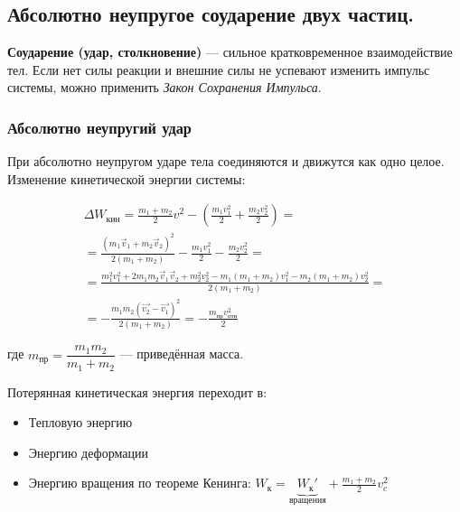 \subsection{Абсолютно неупругое соударение двух частиц.}
\textbf{Соударение (удар, столкновение)} — сильное кратковременное взаимодействие тел. Если нет силы реакции и внешние силы не успевают изменить импульс системы, можно применить \textit{Закон Сохранения Импульса}.

\begin{center}
\end{center}

\subsubsection*{Абсолютно неупругий удар}

При абсолютно неупругом ударе тела соединяются и движутся как одно целое. Изменение кинетической энергии системы:

\begin{multline*}
	\Delta W_\text{кин} = \frac{m_1 + m_2}{2} v^2 - \left(\frac{m_1 v_1^2}{2} + \frac{m_2 v_2^2}{2}\right) = \\
	= \frac{(m_1 \vec{v}_1 + m_2 \vec{v}_2)^2}{2(m_1 + m_2)} - \frac{m_1 v_1^2}{2} - \frac{m_2 v_2^2}{2} = \\
	= \frac{m_1^2 v_1^2 + 2m_1m_2\vec{v}_1\vec{v}_2 + m_2^2v_2^2 - m_1(m_1 + m_2)v_1^2 - m_2(m_1 + m_2)v_2^2}{2(m_1 + m_2)} = \\
	= -\frac{m_1m_2(\vec{v_2} - \vec{v_1})^2}{2(m_1 + m_2)} = -\frac{m_{\text{пр}} v_{\text{отн}}^2}{2}
\end{multline*}

где $m_\text{пр} = \dfrac{m_1m_2}{m_1 + m_2}$ — приведённая масса.

Потерянная кинетическая энергия переходит в:
\begin{itemize}
	\item Тепловую энергию
	\item Энергию деформации
	\item Энергию вращения по теореме Кенинга: $W_\text{к} = \underbrace{W_\text{к}'}_\text{вращения} + \frac{m_1 + m_2}{2} v_c^2$
\end{itemize}

